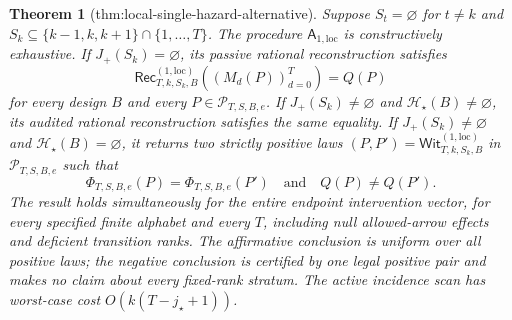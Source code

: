 \documentclass{article}
\newtheorem{theorem}{Theorem}
\begin{document}
\begin{theorem}[thm:local-single-hazard-alternative]\label{thm:local-single-hazard-alternative}
Suppose \(S_t=\varnothing\) for \(t\ne k\) and
\(S_k\subseteq\{k-1,k,k+1\}\cap\{1,\ldots,T\}\).  The procedure
\(\mathsf A_{1,\mathrm{loc}}\) is constructively exhaustive.  If
\(J_+(S_k)=\varnothing\), its passive rational reconstruction satisfies
\[
\mathsf{Rec}^{(1,\mathrm{loc})}_{T,k,S_k,B}((M_d(P))_{d=0}^T)=Q(P)
\]
for every design \(B\) and every \(P\in\mathcal P_{T,S,B,e}\).  If
\(J_+(S_k)\ne\varnothing\) and \(\mathcal H_\star(B)\ne\varnothing\), its audited rational reconstruction satisfies the same equality.  If
\(J_+(S_k)\ne\varnothing\) and \(\mathcal H_\star(B)=\varnothing\), it returns two strictly positive laws
\((P,P')=\mathsf{Wit}^{(1,\mathrm{loc})}_{T,k,S_k,B}\) in
\(\mathcal P_{T,S,B,e}\) such that
\[
\Phi_{T,S,B,e}(P)=\Phi_{T,S,B,e}(P')
\quad\text{and}\quad Q(P)\ne Q(P').
\]
The result holds simultaneously for the entire endpoint intervention vector, for every specified finite alphabet and every \(T\), including null allowed-arrow effects and deficient transition ranks.  The affirmative conclusion is uniform over all positive laws; the negative conclusion is certified by one legal positive pair and makes no claim about every fixed-rank stratum.  The active incidence scan has worst-case cost \(O(k(T-j_\star+1))\).
\end{theorem}
\end{document}
